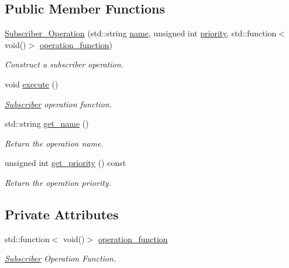 \subsection*{Public Member Functions}
\begin{DoxyCompactItemize}
\item 
\hyperlink{classzcm_1_1Subscriber__Operation_aa0422263c6afea8bba3aa55b4c4e8c84}{Subscriber\+\_\+\+Operation} (std\+::string \hyperlink{classzcm_1_1Base__Operation_a2e2192550818d8f063fc7b2c76c5e21c}{name}, unsigned int \hyperlink{classzcm_1_1Base__Operation_a38af3bcc2578ef215772d595bf3fa358}{priority}, std\+::function$<$ void()$>$ \hyperlink{classzcm_1_1Subscriber__Operation_a5e3ca90f3ea6f1342d76f49363206e06}{operation\+\_\+function})
\begin{DoxyCompactList}\small\item\em Construct a subscriber operation. \end{DoxyCompactList}\item 
void \hyperlink{classzcm_1_1Subscriber__Operation_a2677079c7f3dd85cfc548427c1c101e6}{execute} ()
\begin{DoxyCompactList}\small\item\em \hyperlink{classzcm_1_1Subscriber}{Subscriber} operation function. \end{DoxyCompactList}\item 
std\+::string \hyperlink{classzcm_1_1Base__Operation_a46b6a3f23e18bc35425ec2dab80c849f}{get\+\_\+name} ()
\begin{DoxyCompactList}\small\item\em Return the operation name. \end{DoxyCompactList}\item 
unsigned int \hyperlink{classzcm_1_1Base__Operation_a3b15b35c31ed173d2abb193e9fba32ef}{get\+\_\+priority} () const 
\begin{DoxyCompactList}\small\item\em Return the operation priority. \end{DoxyCompactList}\end{DoxyCompactItemize}
\subsection*{Private Attributes}
\begin{DoxyCompactItemize}
\item 
std\+::function$<$ void()$>$ \hyperlink{classzcm_1_1Subscriber__Operation_a5e3ca90f3ea6f1342d76f49363206e06}{operation\+\_\+function}
\begin{DoxyCompactList}\small\item\em \hyperlink{classzcm_1_1Subscriber}{Subscriber} Operation Function. \end{DoxyCompactList}\end{DoxyCompactItemize}


